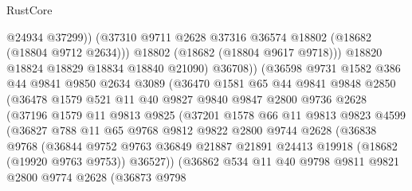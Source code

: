 \begin{lexlean}{RustCore}
\begin{coremodule}
                          @24934
                          @37299))
                      (@37310 @9711 @2628 @37316 @36574 @18802 (@18682 (@18804 @9712 @2634)))
                      @18802
                      (@18682 (@18804 @9617 @9718)))
                    @18820
                    @18824
                    @18829
                    @18834
                    @18840
                    @21090)
                  @36708))
              (@36598
                @9731
                @1582
                @386
                @44
                @9841
                @9850
                @2634
                @3089
                (@36470
                  @1581
                  @65
                  @44
                  @9841
                  @9848
                  @2850
                  (@36478
                    @1579
                    @521
                    @11
                    @40
                    @9827
                    @9840
                    @9847
                    @2800
                    @9736
                    @2628
                    (@37196
                      @1579
                      @11
                      @9813
                      @9825
                      (@37201
                        @1578
                        @66
                        @11
                        @9813
                        @9823
                        @4599
                        (@36827
                          @788
                          @11
                          @65
                          @9768
                          @9812
                          @9822
                          @2800
                          @9744
                          @2628
                          (@36838
                            @9768
                            (@36844
                              @9752
                              @9763
                              @36849
                              @21887
                              @21891
                              @24413
                              @19918
                              (@18682 (@19920 @9763 @9753))
                              @36527))
                          (@36862
                            @534
                            @11
                            @40
                            @9798
                            @9811
                            @9821
                            @2800
                            @9774
                            @2628
                            (@36873
                              @9798

\end{coremodule}
\end{lexlean}
